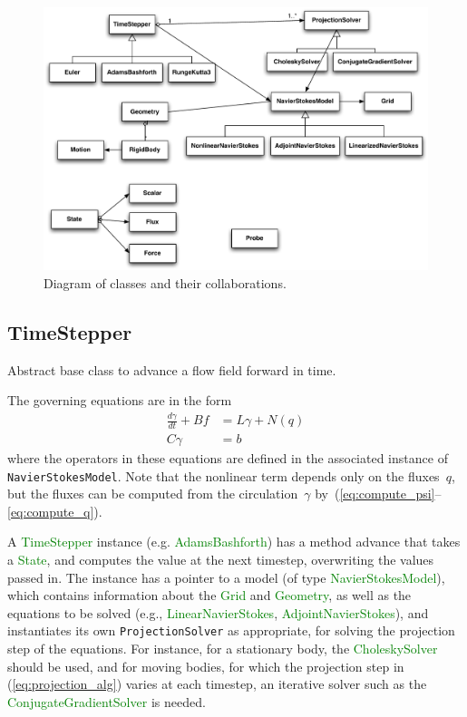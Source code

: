 \documentclass[11pt]{article}
\def\class#1{\textcolor{green}{\ttfamily\small #1}} %
\def\fn#1{{\ttfamily\small #1}} %
\let\code\lstinline
\begin{document}
\begin{figure}
\centering
\includegraphics[width=0.95\linewidth]{IBFSDesign}
\caption{Diagram of classes and their collaborations.}
\label{fig:class_diagram}
\end{figure}

\subsection{TimeStepper}
Abstract base class to advance a flow field forward in time.

The governing equations are in the form
\begin{equation}
\begin{aligned}
\frac{d\gamma}{dt} + Bf &= L\gamma + N(q)\\
C\gamma &= b
\end{aligned}
\label{eq:model}
\end{equation}
where the operators in these equations are defined in the associated instance of \code|NavierStokesModel|.  Note that the nonlinear term depends only on the fluxes~$q$, but the fluxes can be computed from the circulation~$\gamma$ by~(\ref{eq:compute_psi}--\ref{eq:compute_q}).

A \class{TimeStepper} instance (e.g. \class{AdamsBashforth}) has a method \fn{advance} that takes a \class{State}, and computes the value at the next timestep, overwriting the values passed in.  The instance has a pointer to a model (of type \class{NavierStokesModel}), which contains information about the \class{Grid} and \class{Geometry}, as well as the equations to be solved (e.g., \class{LinearNavierStokes}, \class{AdjointNavierStokes}), and instantiates its own \code|ProjectionSolver| as appropriate, for solving the projection step of the equations.  For instance, for a stationary body, the \class{CholeskySolver} should be used, and for moving bodies, for which the projection step in (\ref{eq:projection_alg}) varies at each timestep, an iterative solver such as the \class{ConjugateGradientSolver} is needed.
\end{document}
